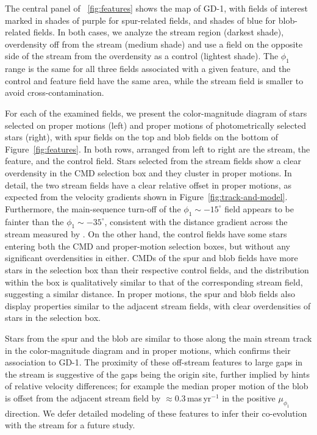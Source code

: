\documentclass[modern]{aastex62}
\begin{document}
The central panel of \figurename~\ref{fig:features} shows the map of GD-1, with fields of interest marked in shades of purple for spur-related fields, and shades of blue for blob-related fields.
In both cases, we analyze the stream region (darkest shade), overdensity off from the stream (medium shade) and use a field on the opposite side of the stream from the overdensity as a control (lightest shade).
The $\phi_1$ range is the same for all three fields associated with a given feature, and the control and feature field have the same area, while the stream field is smaller to avoid cross-contamination.

For each of the examined fields, we present the color-magnitude diagram of stars selected on proper motions (left) and proper motions of photometrically selected stars (right), with spur fields on the top and blob fields on the bottom of Figure~\ref{fig:features}.
In both rows, arranged from left to right are the stream, the feature, and the control field.
Stars selected from the stream fields show a clear overdensity in the CMD selection box and they cluster in proper motions.
In detail, the two stream fields have a clear relative offset in proper motions, as expected from the velocity gradients shown in Figure~\ref{fig:track-and-model}.
Furthermore, the main-sequence turn-off of the $\phi_1\sim-15^\circ$ field appears to be fainter than the $\phi_1\sim-35^\circ$, consistent with the distance gradient across the stream measured by \citet{Koposov:2010}.
On the other hand, the control fields have some stars entering both the CMD and proper-motion selection boxes, but without any significant overdensities in either.
CMDs of the spur and blob fields have more stars in the selection box than their respective control fields, and the distribution within the box is qualitatively similar to that of the corresponding stream field, suggesting a similar distance.
In proper motions, the spur and blob fields also display properties similar to the adjacent stream fields, with clear overdensities of stars in the selection box.

Stars from the spur and the blob are similar to those along the main stream track in the color-magnitude diagram and in proper motions, which confirms their association to GD-1.
The proximity of these off-stream features to large gaps in the stream is suggestive of the gaps being the origin site, further implied by hints of relative velocity differences; for example the median proper motion of the blob is offset from the adjacent stream field by $\approx0.3$\,mas\,yr$^{-1}$ in the positive $\mu_{\phi_1}$ direction.
We defer detailed modeling of these features to infer their co-evolution with the stream for a future study.
\end{document}
